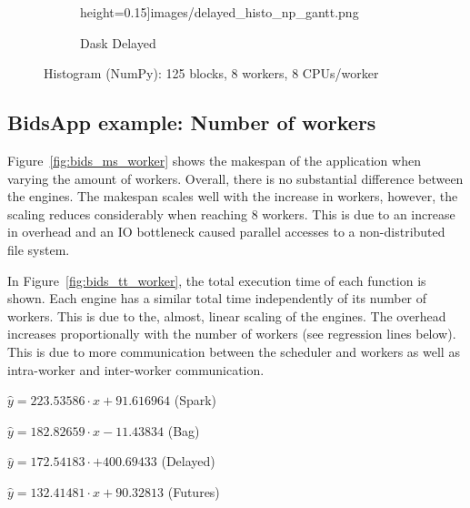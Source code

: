 \documentclass[conference]{IEEEtran}
\begin{document}
\begin{figure}[!tb]
\begin{subfigure}[b]{\columnwidth}
        height=0.15\textheight]{images/delayed_histo_np_gantt.png}%
        \caption{Dask Delayed}\label{fig:histo_np_dask_delayed_gantt}
    \end{subfigure}
    \caption{Histogram (NumPy): 125 blocks, 8 workers, 8
    CPUs/worker}\label{fig:histo_np_gantt}
\end{figure}

\subsection{BidsApp example: Number of workers}
Figure~\ref{fig:bids_ms_worker} shows the makespan of the application when
varying the amount of workers. Overall, there is no substantial difference
between the engines. The makespan scales well with the increase in workers,
however, the scaling reduces considerably when reaching 8 workers. This is due
to an increase in overhead and an IO bottleneck caused parallel accesses to 
a non-distributed file system.

In Figure~\ref{fig:bids_tt_worker}, the total execution time of each function is
shown. Each engine has a similar total time independently of its number of workers.
This is due to the, almost, linear scaling of the engines. The overhead increases
proportionally with the number of workers (see regression lines below). This is due
to more communication between the scheduler and workers as well as intra-worker and
inter-worker communication.


\hspace{1cm}\(\hat{y}=223.53586\cdot{x} + 91.616964\) (Spark)

\hspace{1cm}\(\hat{y}=182.82659\cdot{x} - 11.43834\) (Bag)

\hspace{1cm}\(\hat{y}=172.54183\cdot + 400.69433\) (Delayed)

\hspace{1cm}\(\hat{y}=132.41481\cdot{x} + 90.32813\) (Futures)
\end{document}
